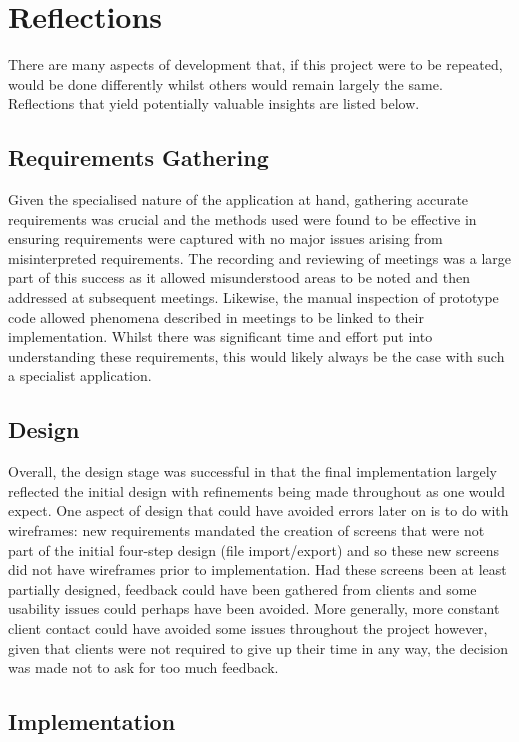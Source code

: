 \documentclass{l4proj}
\begin{document}
\section{Reflections}
There are many aspects of development that, if this project were to be repeated, would be done differently whilst others would remain largely the same. Reflections that yield potentially valuable insights are listed below.

\subsection{Requirements Gathering}
Given the specialised nature of the application at hand, gathering accurate requirements was crucial and the methods used were found to be effective in ensuring requirements were captured with no major issues arising from misinterpreted requirements. The recording and reviewing of meetings was a large part of this success as it allowed misunderstood areas to be noted and then addressed at subsequent meetings. Likewise, the manual inspection of prototype code allowed phenomena described in meetings to be linked to their implementation. Whilst there was significant time and effort put into understanding these requirements, this would likely always be the case with such a specialist application.

\subsection{Design}
Overall, the design stage was successful in that the final implementation largely reflected the initial design with refinements being made throughout as one would expect. One aspect of design that could have avoided errors later on is to do with wireframes: new requirements mandated the creation of screens that were not part of the initial four-step design (file import/export) and so these new screens did not have wireframes prior to implementation. Had these screens been at least partially designed, feedback could have been gathered from clients and some usability issues could perhaps have been avoided. More generally, more constant client contact could have avoided some issues throughout the project however, given that clients were not required to give up their time in any way, the decision was made not to ask for too much feedback.

\subsection{Implementation}
\end{document}
